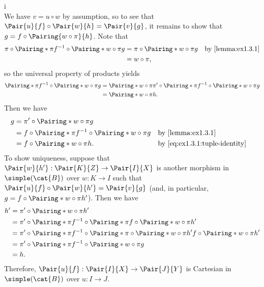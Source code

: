 \begin{partsolution}{i}
\begin{equation*}
\end{equation*}
We have \(v = u \circ w\) by assumption, so to see that \(\Pair{u}{f} \circ \Pair{w}{h} = \Pair{v}{g}\), it remains to show that \(g = f \circ \Pairing{w\circ\pi}{h}\).
Note that
\begin{align*}
\pi \circ \Pairing*{\pi}{f}^{-1} \circ \Pairing*{w \circ \pi}{g}
&= \pi \circ \Pairing*{w \circ \pi}{g} & &\text{by \Cref{lemma:ex1.3.1}} \\
&= w \circ \pi,
\end{align*}
so the universal property of products yields
\begin{equation}
\label{eq:ex1.3.1:tuple-identity}
\begin{aligned}
\Pairing*{\pi}{f}^{-1} \circ \Pairing*{w \circ \pi}{g}
&= \Pairing*{w \circ \pi}{\pi^\prime \circ \Pairing*{\pi}{f}^{-1} \circ \Pairing*{w \circ \pi}{g}} \\
&= \Pairing*{w \circ \pi}{h}.
\end{aligned}
\end{equation}
Then we have
\begin{align*}
g
&= \pi^\prime \circ \Pairing*{w \circ \pi}{g} \\
&= f \circ \Pairing*{\pi}{f}^{-1} \circ \Pairing*{w \circ \pi}{g} & &\text{by \Cref{lemma:ex1.3.1}} \\
&= f \circ \Pairing*{w \circ \pi}{h}. & &\text{by~\eqref{eq:ex1.3.1:tuple-identity}}
\end{align*}
To show uniqueness, suppose that \(\Pair{w}{h^\prime} : \Pair{K}{Z} \to \Pair{I}{X}\) is another morphism in \(\simple(\cat{B})\) over \(w: K \to I\) such that \(\Pair{u}{f} \circ \Pair{w}{h^\prime} = \Pair{v}{g}\) (and, in particular, \(g = f \circ \Pairing*{w \circ \pi}{h^\prime}\)).
Then we have
\begin{align*}
h^\prime
&= \pi^\prime \circ \Pairing*{w \circ \pi}{h^\prime} \\
&= \pi^\prime \circ \Pairing*{\pi}{f}^{-1} \circ \Pairing*{\pi}{f} \circ \Pairing*{w \circ \pi}{h^\prime} \\
&= \pi^\prime \circ \Pairing*{\pi}{f}^{-1} \circ \Pairing*{\pi \circ \Pairing*{w \circ \pi}{h^\prime}}{f \circ \Pairing*{w \circ \pi}{h^\prime}} \\
&= \pi^\prime \circ \Pairing*{\pi}{f}^{-1} \circ \Pairing*{w \circ \pi}{g} \\
&= h.
\end{align*}
Therefore, \(\Pair{u}{f} : \Pair{I}{X} \to \Pair{J}{Y}\) is Cartesian in \(\simple(\cat{B})\) over \(u : I \to J\).
\end{partsolution}

